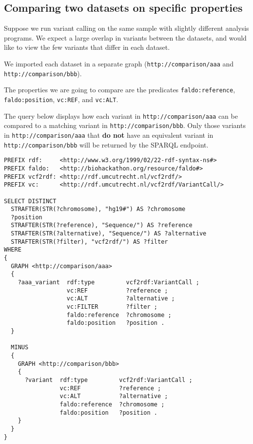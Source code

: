 \subsection{Comparing two datasets on specific properties}

  Suppose we run variant calling on the same sample with slightly different
  analysis programs.  We expect a large overlap in variants between the
  datasets, and would like to view the few variants that differ in each dataset.

  We imported each dataset in a separate graph (\texttt{http://comparison/aaa}
  and \texttt{http://comparison/bbb}).

  The properties we are going to compare are the predicates \texttt{faldo:reference},
  \texttt{faldo:position}, \texttt{vc:REF}, and \texttt{vc:ALT}.

  The query below displays how each variant in \texttt{http://comparison/aaa}
  can be compared to a matching variant in \texttt{http://comparison/bbb}.
  Only those variants in \texttt{http://comparison/aaa} that \textbf{do not}
  have an equivalent variant in \texttt{http://comparison/bbb} will be
  returned by the SPARQL endpoint.

\begin{siderules}
\begin{verbatim}
PREFIX rdf:     <http://www.w3.org/1999/02/22-rdf-syntax-ns#>
PREFIX faldo:   <http://biohackathon.org/resource/faldo#>
PREFIX vcf2rdf: <http://rdf.umcutrecht.nl/vcf2rdf/>
PREFIX vc:      <http://rdf.umcutrecht.nl/vcf2rdf/VariantCall/>

SELECT DISTINCT
  STRAFTER(STR(?chromosome), "hg19#") AS ?chromosome
  ?position
  STRAFTER(STR(?reference), "Sequence/") AS ?reference
  STRAFTER(STR(?alternative), "Sequence/") AS ?alternative
  STRAFTER(STR(?filter), "vcf2rdf/") AS ?filter
WHERE
{
  GRAPH <http://comparison/aaa>
  {
    ?aaa_variant  rdf:type         vcf2rdf:VariantCall ;
                  vc:REF           ?reference ;
                  vc:ALT           ?alternative ;
                  vc:FILTER        ?filter ;
                  faldo:reference  ?chromosome ;
                  faldo:position   ?position .
  }

  MINUS
  {
    GRAPH <http://comparison/bbb>
    {
      ?variant  rdf:type         vcf2rdf:VariantCall ;
                vc:REF           ?reference ;
                vc:ALT           ?alternative ;
                faldo:reference  ?chromosome ;
                faldo:position   ?position .
    }
  }
}
\end{verbatim}
\end{siderules}


